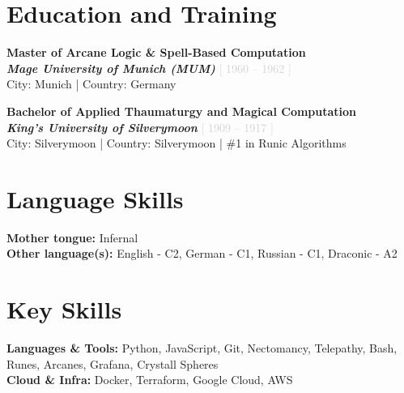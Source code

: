 \documentclass[9pt,a4paper]{article}
\newcommand{\dates}[1]{%
  \textcolor{LIGHTGRAY}{[ #1 ]}
}
\newcommand{\eduentry}[4]{%
  \textcolor{LABELGRAY}{\textbf{#1}} \\
  \textcolor{MEDIUMGRAY}{\textit{\textbf{#3}}} \dates{#2} \\
  \textcolor{MEDIUMGRAY}{#4} 
}
\begin{document}

\section*{Education and Training}
\begin{spacing}{1.2}
    \eduentry{Master of Arcane Logic \& Spell-Based Computation}{1960 – 1962}{Mage University of Munich (MUM)}{City: Munich \quad | \quad Country: Germany}\\
    {\eduentry{Bachelor of Applied Thaumaturgy and Magical Computation}{1909 – 1917}{King's University of Silverymoon}{City: Silverymoon \quad | \quad Country: Silverymoon \quad | \quad \#1 in Runic Algorithms}
}%
\end{spacing}


\section*{Language Skills}
\begin{spacing}{1.2}
    {\textbf{Mother tongue:} Infernal \\
    \textbf{Other language(s):} English - C2, German - C1, Russian - C1, Draconic - A2  
}%
\end{spacing}

\section*{Key Skills} 
\begin{spacing}{1.2}{
    \textbf{Languages \& Tools:} Python, JavaScript, Git, Nectomancy, Telepathy, Bash, Runes, Arcanes, Grafana, Crystall Spheres \\
    \textbf{Cloud \& Infra:} Docker, Terraform, Google Cloud, AWS \\
}
\end{spacing}
\end{document}

